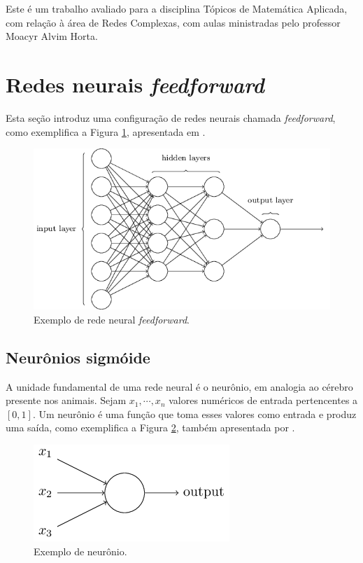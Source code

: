 \documentclass{article}
\begin{document}
        Este é um trabalho avaliado para a disciplina Tópicos de Matemática Aplicada, com relação à área de Redes Complexas, com aulas ministradas pelo professor Moacyr Alvim Horta.

    \section{Redes neurais \textit{feedforward}}
        \label{feedforward}

        Esta seção introduz uma configuração de redes neurais chamada \textit{feedforward}, como exemplifica a Figura \ref{fig1}, apresentada em \cite{nielsen2015neural}.

        \begin{figure}[h!]
            \centering
            \includegraphics[scale=0.5]{Images/Feedforward neural network.png}
            \caption{Exemplo de rede neural \textit{feedforward}.}
            \label{fig1}
        \end{figure}        

        \subsection{Neurônios sigmóide}

            A unidade fundamental de uma rede neural é o neurônio, em analogia ao cérebro presente nos animais.
            Sejam $x_1, \cdots, x_n$ valores numéricos de entrada pertencentes a $[0, 1]$.
            Um neurônio é uma função que toma esses valores como entrada e produz uma saída, como exemplifica a Figura \ref{fig2}, também apresentada por \cite{nielsen2015neural}.

            \begin{figure}[h!]
                \centering
                \includegraphics[scale=0.5]{Images/Sigmoid neuron.png}
                \caption{Exemplo de neurônio.}
                \label{fig2}
            \end{figure}
            
\end{document}

